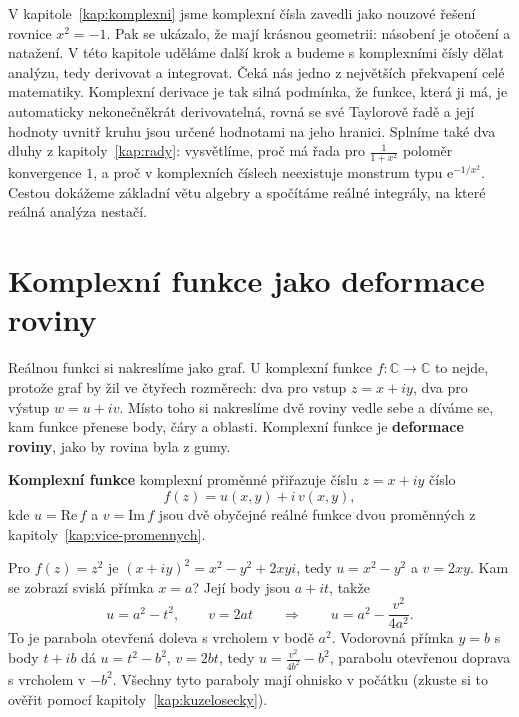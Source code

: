 \label{kap:komplexni-analyza}

V kapitole~\ref{kap:komplexni} jsme komplexní čísla zavedli jako nouzové řešení rovnice $x^2 = -1$. Pak se ukázalo, že mají krásnou geometrii: násobení je otočení a natažení. V této kapitole uděláme další krok a budeme s komplexními čísly dělat analýzu, tedy derivovat a integrovat. Čeká nás jedno z největších překvapení celé matematiky. Komplexní derivace je tak silná podmínka, že funkce, která ji má, je automaticky nekonečněkrát derivovatelná, rovná se své Taylorově řadě a její hodnoty uvnitř kruhu jsou určené hodnotami na jeho hranici. Splníme také dva dluhy z kapitoly~\ref{kap:rady}: vysvětlíme, proč má řada pro $\frac{1}{1 + x^2}$ poloměr konvergence $1$, a proč v komplexních číslech neexistuje monstrum typu $\mathrm{e}^{-1/x^2}$. Cestou dokážeme základní větu algebry a spočítáme reálné integrály, na které reálná analýza nestačí.

\section{Komplexní funkce jako deformace roviny}

Reálnou funkci si nakreslíme jako graf. U komplexní funkce $f\colon\mathbb{C}\to\mathbb{C}$ to nejde, protože graf by žil ve čtyřech rozměrech: dva pro vstup $z = x + iy$, dva pro výstup $w = u + iv$. Místo toho si nakreslíme dvě roviny vedle sebe a díváme se, kam funkce přenese body, čáry a oblasti. Komplexní funkce je \textbf{deformace roviny}, jako by rovina byla z gumy.

\begin{definitionbox}
  \textbf{Komplexní funkce} komplexní proměnné přiřazuje číslu $z = x + iy$ číslo
  \begin{equation*}
    f(z) = u(x, y) + i\,v(x, y),
  \end{equation*}
  kde $u = \mathrm{Re}\,f$ a $v = \mathrm{Im}\,f$ jsou dvě obyčejné reálné funkce dvou proměnných z kapitoly~\ref{kap:vice-promennych}.
\end{definitionbox}

\begin{example}
  Pro $f(z) = z^2$ je $(x + iy)^2 = x^2 - y^2 + 2xyi$, tedy $u = x^2 - y^2$ a $v = 2xy$. Kam se zobrazí svislá přímka $x = a$? Její body jsou $a + it$, takže
  \begin{equation*}
    u = a^2 - t^2,\qquad v = 2at\qquad\Longrightarrow\qquad u = a^2 - \frac{v^2}{4a^2}.
  \end{equation*}
  To je parabola otevřená doleva s vrcholem v bodě $a^2$. Vodorovná přímka $y = b$ s body $t + ib$ dá $u = t^2 - b^2$, $v = 2bt$, tedy $u = \frac{v^2}{4b^2} - b^2$, parabolu otevřenou doprava s vrcholem v $-b^2$. Všechny tyto paraboly mají ohnisko v počátku (zkuste si to ověřit pomocí kapitoly~\ref{kap:kuzelosecky}).
\end{example}


